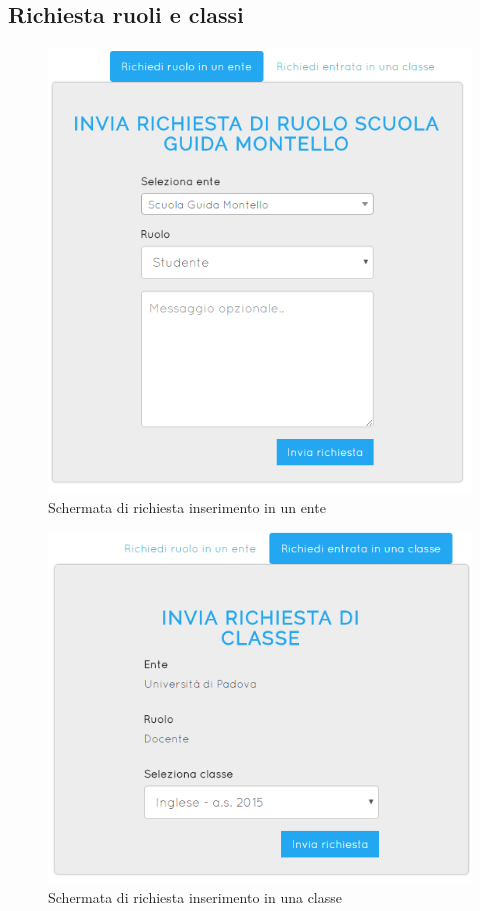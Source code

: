 \documentclass[a4paper, titlepage]{article}
\begin{document}
	\subsection{Richiesta ruoli e classi}
	\begin{figure}[!h]
		\centering
		\includegraphics[scale=0.33]{Img/screen_RichiestaRuolo.png}
		\caption{Schermata di richiesta inserimento in un ente}
	\end{figure}	
	\begin{figure}[!h]
		\centering
		\includegraphics[scale=0.33]{Img/screen_RichiestaClasse.png}
		\caption{Schermata di richiesta inserimento in una classe}
	\end{figure}
\end{document}
